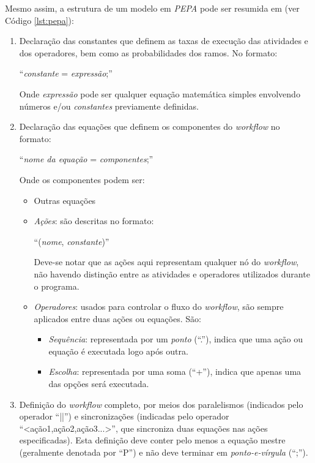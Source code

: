 \documentclass[a4paper,11pt]{article}
\begin{document}
        Mesmo assim, a estrutura de um modelo em \emph{PEPA} pode ser resumida em (ver C\'odigo \ref{lst:pepa}):

        \begin{enumerate}
            \item Declaração das constantes que definem as taxas de execução das atividades e dos operadores, bem como as probabilidades dos ramos. No formato: 

            ``\emph{constante} = \emph{express\~ao};''

            Onde \emph{express\~ao} pode ser qualquer equaç\~ao matemática simples envolvendo n\'umeros e/ou \emph{constantes} previamente definidas.

            \item Declaração das equaç\~oes que definem os componentes do \emph{workflow} no formato:

            ``\emph{nome da equaç\~ao} = \emph{componentes};''

            Onde os componentes podem ser:
            \begin{itemize}
                \item Outras equaç\~oes
                \item \emph{Aç\~oes}: s\~ao descritas no formato: 

                ``(\emph{nome}, \emph{constante})''

                Deve-se notar que as aç\~oes aqui representam qualquer n\'o do \emph{workflow}, n\~ao havendo distinç\~ao entre as atividades e operadores utilizados durante o programa.
                \item \emph{Operadores}: usados para controlar o fluxo do \emph{workflow}, s\~ao sempre aplicados entre duas aç\~oes ou equaç\~oes. S\~ao:
                \begin{itemize}
                    \item \emph{Sequ\^encia}: representada por um \emph{ponto} (``.''), indica que uma aç\~ao ou equaç\~ao \'e executada logo ap\'os outra.
                    \item \emph{Escolha}: representada por uma soma (``+''), indica que apenas uma das opç\~oes ser\'a executada.
                \end{itemize}
            \end{itemize}

            \item Definiç\~ao do \emph{workflow} completo, por meios dos paralelismos (indicados pelo operador ``||'') e sincronizaç\~oes (indicadas pelo operador ``<aç\~ao1,aç\~ao2,aç\~ao3...>'', que sincroniza duas equaç\~oes nas aç\~oes especificadas). Esta definiç\~ao deve conter pelo menos a equaç\~ao mestre (geralmente denotada por ``P'') e n\~ao deve terminar em \emph{ponto-e-v\'irgula} (``;'').
        \end{enumerate}
\end{document}
